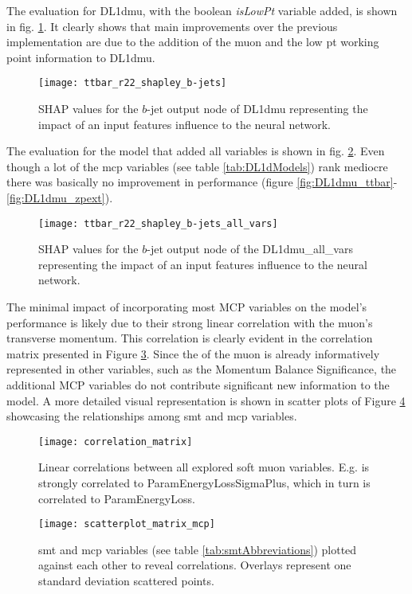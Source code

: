 The evaluation for DL1dmu, with the boolean \textit{isLowPt} variable added, is shown in fig. \ref{fig:shapleyDL1dmu}. It clearly shows that main improvements over the previous implementation are due to the addition of the muon \pt and the low pt working point information to DL1dmu.
\begin{figure}[]
  \centering
  \texttt{[image: ttbar\_r22\_shapley\_b-jets]}
  \caption{SHAP values for the $b$-jet output node of DL1dmu representing the impact of an input features influence to the neural network.}
  \label{fig:shapleyDL1dmu}
\end{figure}
The evaluation for the model that added all variables is shown in fig. \ref{fig:ttbar_r22_shapley_b_all_vars}. Even though a lot of the \ac{mcp} variables (see table \ref{tab:DL1dModels}) rank mediocre there was basically no improvement in performance (figure \ref{fig:DL1dmu_ttbar}-\ref{fig:DL1dmu_zpext}).
\begin{figure}[]
  \centering
  \texttt{[image: ttbar\_r22\_shapley\_b-jets\_all\_vars]}
  \caption{SHAP values for the $b$-jet output node of the DL1dmu\_all\_vars representing the impact of an input features influence to the neural network.}
  \label{fig:ttbar_r22_shapley_b_all_vars}
\end{figure}
The minimal impact of incorporating most MCP variables on the model's performance is likely due to their strong linear correlation with the muon's transverse momentum. This correlation is clearly evident in the correlation matrix presented in Figure \ref{fig:correlation_matrix}. Since the \pt of the muon is already informatively represented in other variables, such as the Momentum Balance Significance, the additional MCP variables do not contribute significant new information to the model. A more detailed visual representation is shown in scatter plots of Figure \ref{fig:scatterplot_matrix_mcp} showcasing the relationships among \ac{smt} and \ac{mcp} variables.
\begin{figure}[]
  \centering
  \texttt{[image: correlation\_matrix]}
  \caption{Linear correlations between all explored soft muon variables. E.g. \pt is strongly correlated to ParamEnergyLossSigmaPlus, which in turn is  correlated to ParamEnergyLoss. }
  \label{fig:correlation_matrix}
\end{figure}

\begin{figure}[]
  \centering
  \texttt{[image: scatterplot\_matrix\_mcp]}
  \caption{\ac{smt} and \ac{mcp} variables (see table \ref{tab:smtAbbreviations}) plotted against each other to reveal correlations. Overlays represent one standard deviation scattered points.}
  \label{fig:scatterplot_matrix_mcp}
\end{figure}


